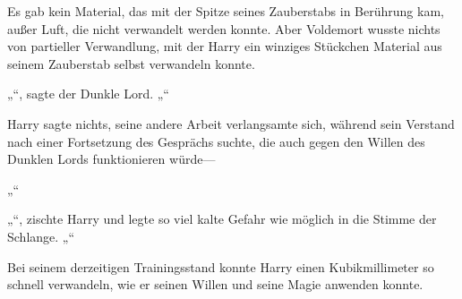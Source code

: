 Es gab kein Material, das mit der Spitze seines Zauberstabs in Berührung kam, außer Luft, die nicht verwandelt werden konnte. Aber Voldemort wusste nichts von partieller Verwandlung, mit der Harry ein winziges Stückchen Material aus seinem Zauberstab selbst verwandeln konnte.

„“, sagte der Dunkle Lord. „“

Harry sagte nichts, seine andere Arbeit verlangsamte sich, während sein Verstand nach einer Fortsetzung des Gesprächs suchte, die auch gegen den Willen des Dunklen Lords funktionieren würde—

„“

„“, zischte Harry und legte so viel kalte Gefahr wie möglich in die Stimme der Schlange. „“

Bei seinem derzeitigen Trainingsstand konnte Harry einen Kubikmillimeter so schnell verwandeln, wie er seinen Willen und seine Magie anwenden konnte.

